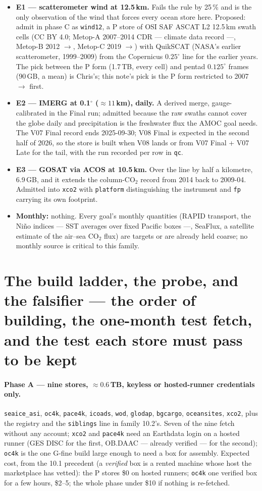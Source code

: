 \documentclass[10pt]{article}
\newcommand{\code}[1]{\texttt{#1}}
\begin{document}
\begin{itemize}\itemsep2pt
\item \textbf{E1 --- scatterometer wind at 12.5\,km.} Fails the rule by 25\,\%
and is the only observation of the wind that forces every ocean store here.
Proposed: admit in phase C as \code{wind12}, a P store of OSI SAF ASCAT L2
12.5\,km swath cells (CC BY 4.0; Metop-A 2007--2014 CDR --- climate data record ---, Metop-B 2012 $\to$,
Metop-C 2019 $\to$) with QuikSCAT (NASA's earlier scatterometer, 1999--2009) from the Copernicus
$0.25^\circ$ line for the earlier years. The pick between the P form (1.7\,TB,
every cell) and pentad $0.125^\circ$ frames (90\,GB, a mean) is Chris's; this
note's pick is the P form restricted to 2007 $\to$ first.
\item \textbf{E2 --- IMERG at 0.1$^\circ$ ($\approx 11$\,km), daily.} A
derived merge, gauge-calibrated in the Final run; admitted because the raw
swaths cannot cover the globe daily and precipitation is the freshwater flux
the AMOC goal needs. The V07 Final record ends 2025-09-30; V08 Final is
expected in the second half of 2026, so the store is built when V08 lands or from V07
Final + V07 Late for the tail, with the run recorded per row in \code{qc}.
\item \textbf{E3 --- GOSAT via ACOS at 10.5\,km.} Over the line by half a
kilometre, 6.9\,GB, and it extends the column-CO$_2$ record from 2014 back to
2009-04. Admitted into \code{xco2} with \code{platform} distinguishing the
instrument and \code{fp} carrying its own footprint.
\item \textbf{Monthly:} nothing. Every goal's monthly quantities (RAPID
transport, the Ni\~no indices --- SST averages over fixed Pacific boxes ---, SeaFlux, a satellite estimate of the air--sea CO$_2$ flux) are targets or are already held
coarse; no monthly source is critical to this family.
\end{itemize}

\section{The build ladder, the probe, and the falsifier --- the order of building, the one-month test fetch, and the test each store must pass to be kept}

\paragraph{Phase A --- nine stores, $\approx 0.6$\,TB, keyless or
hosted-runner credentials only.} \code{seaice\_asi}, \code{oc4k},
\code{pace4k}, \code{icoads}, \code{wod}, \code{glodap}, \code{bgcargo},
\code{oceansites},
\code{xco2}, plus the registry and the \code{siblings} line in family 10.2's.
Seven of the nine fetch without any account; \code{xco2} and \code{pace4k}
need an Earthdata login on a hosted runner (GES DISC for the first, OB.DAAC
--- already verified --- for the second); \code{oc4k} is the one G-fine build large enough to
need a box for assembly. Expected cost, from the 10.1 precedent (a \emph{verified} box is a rented machine whose host the marketplace has vetted): the P stores
\$0 on hosted runners; \code{oc4k} one verified box for a few hours, \$2--5;
the whole phase under \$10 if nothing is re-fetched.
\end{document}
